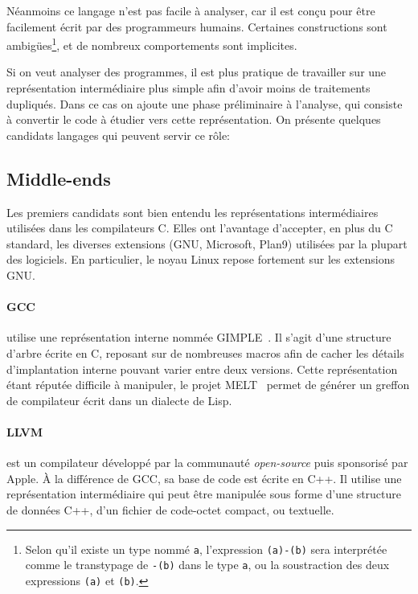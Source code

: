 Néanmoins ce langage n'est pas facile à analyser, car il est conçu pour être
facilement écrit par des programmeurs humains. Certaines constructions sont
ambigües\footnote{
    Selon qu'il existe un type nommé \texttt{a}, l'expression \texttt{(a)-(b)}
    sera interprétée comme le transtypage de \texttt{-(b)} dans le type
    \texttt{a}, ou la soustraction des deux expressions \texttt{(a)} et
    \texttt{(b)}.
}, et de nombreux comportements sont implicites.


Si on veut analyser des programmes, il est plus pratique de travailler sur une
représentation intermédiaire plus simple afin d'avoir moins de traitements
dupliqués. Dans ce cas on ajoute une phase préliminaire à l'analyse, qui
consiste à convertir le code à étudier vers cette représentation. On présente
quelques candidats langages qui peuvent servir ce rôle:

\subsection*{Middle-ends}

Les premiers candidats sont bien entendu les représentations intermédiaires
utilisées dans les compilateurs C. Elles ont l'avantage d'accepter, en plus du C
standard, les diverses extensions (GNU, Microsoft, Plan9) utilisées par la
plupart des logiciels. En particulier, le noyau Linux repose fortement sur les
extensions GNU.\@

\paragraph{GCC} utilise une représentation interne nommée
GIMPLE~\cite{gcc-gimple}. Il s'agit d'une structure d'arbre écrite en C,
reposant sur de nombreuses macros afin de cacher les détails d'implantation
interne pouvant varier entre deux versions. Cette représentation étant réputée
difficile à manipuler, le projet MELT~\cite{gcc-melt} permet de générer un
greffon de compilateur écrit dans un dialecte de Lisp.


\paragraph{LLVM}\cite{llvm-pres} est un compilateur développé par la communauté
\emph{open-source} puis sponsorisé par Apple. À la différence de GCC, sa base de
code est écrite en C++. Il utilise une représentation intermédiaire qui peut
être manipulée sous forme d'une structure de données C++, d'un fichier de
code-octet compact, ou textuelle.

